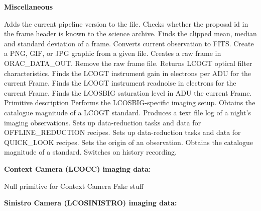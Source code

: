 \documentclass[twoside,11pt,nolof]{starlink}
\begin{document}
\begin{small}
{\large
\begin{center}
\textbf{Miscellaneous}
\end{center}
}
\begin{description}
Adds the current pipeline version to the file.
Checks whether the proposal id in the frame header is known to the science archive.
Finds the clipped mean, median and standard deviation of a frame.
Converts current observation to FITS.
Create a PNG, GIF, or JPG graphic from a given file.
Creates a raw frame in ORAC\_DATA\_OUT.
Remove the raw frame file.
Returns LCOGT optical filter characteristics.
Finds the LCOGT instrument gain in electrons per ADU for the current Frame.
Finds the LCOGT instrument readnoise in electrons for the current Frame.
Finds the LCOSBIG saturation level in ADU the current Frame.
Primitive description
Performs the LCOSBIG-specific imaging setup.
Obtains the catalogue magnitude of a LCOGT standard.
Produces a text file log of a night's imaging observations.
Sets up data-reduction tasks and data for OFFLINE\_REDUCTION recipes.
Sets up data-reduction tasks and data for QUICK\_LOOK recipes.
Sets the origin of an observation.
Obtains the catalogue magnitude of a standard.
Switches on history recording.
\end{description}

{\large
\begin{center}
\textbf{Context Camera (LCOCC) imaging data:}
\end{center}
}

\begin{description}
Null primitive for Context Camera
Fake stuff
\end{description}

{\large
\begin{center}
\textbf{Sinistro Camera (LCOSINISTRO) imaging data:}
\end{center}
}


\end{small}
\end{document}
